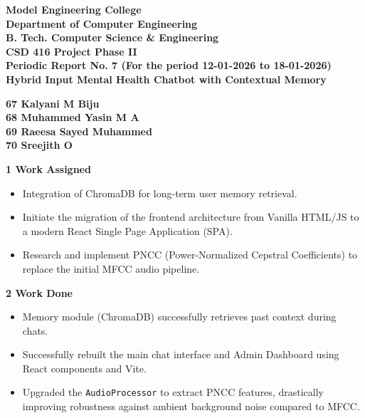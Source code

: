 \documentclass[12pt,a4paper]{article}
\begin{document}
\vfill
\newpage


\begin{center}
{\Large \textbf{Model Engineering College}}\\[0.2em]
{\large \textbf{Department of Computer Engineering}}\\[0.2em]
{\large \textbf{B. Tech. Computer Science \& Engineering}}\\[0.2em]
{\large \textbf{CSD 416 Project Phase II}}\\[1em]
{\large \textbf{Periodic Report No. 7 (For the period 12-01-2026 to 18-01-2026)}}\\[1.5em]

{\Large \textbf{Hybrid Input Mental Health Chatbot with Contextual Memory}}\\[0.2em]

\end{center}

\begin{center}
\textbf{67  Kalyani M Biju\\
68 Muhammed Yasin M A\\
69 Raeesa Sayed Muhammed\\
70 Sreejith O\\[1.5em]}
\end{center}

\noindent\textbf{1 \quad Work Assigned}
\begin{itemize}
    \item Integration of ChromaDB for long-term user memory retrieval.
    \item Initiate the migration of the frontend architecture from Vanilla HTML/JS to a modern React Single Page Application (SPA).
    \item Research and implement PNCC (Power-Normalized Cepstral Coefficients) to replace the initial MFCC audio pipeline.
\end{itemize}

\noindent\textbf{2 \quad Work Done}
\begin{itemize}
    \item Memory module (ChromaDB) successfully retrieves past context during chats.
    \item Successfully rebuilt the main chat interface and Admin Dashboard using React components and Vite.
    \item Upgraded the \texttt{AudioProcessor} to extract PNCC features, drastically improving robustness against ambient background noise compared to MFCC.
\end{itemize}
\end{document}
